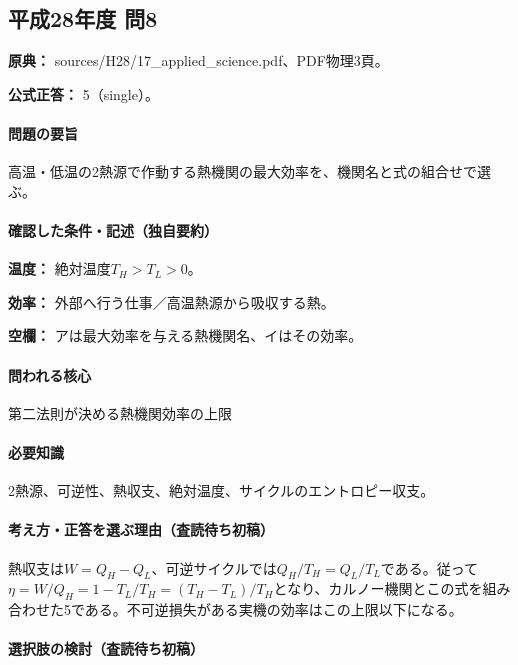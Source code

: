 \subsection{平成28年度 問8}
\label{q:h28-reg-applied-08}

\noindent\textbf{原典：} sources/H28/17\_applied\_science.pdf、PDF物理3頁。

\textbf{公式正答：} 5（single）。

\paragraph{問題の要旨} 高温・低温の2熱源で作動する熱機関の最大効率を、機関名と式の組合せで選ぶ。

\paragraph{確認した条件・記述（独自要約）}\mbox{}\par

\noindent\textbf{温度：} 絶対温度\(T_H>T_L>0\)。\par

\noindent\textbf{効率：} 外部へ行う仕事／高温熱源から吸収する熱。\par

\noindent\textbf{空欄：} アは最大効率を与える熱機関名、イはその効率。\par

\paragraph{問われる核心} 第二法則が決める熱機関効率の上限

\paragraph{必要知識} 2熱源、可逆性、熱収支、絶対温度、サイクルのエントロピー収支。

\paragraph{考え方・正答を選ぶ理由（査読待ち初稿）} 熱収支は\(W=Q_H-Q_L\)、可逆サイクルでは\(Q_H/T_H=Q_L/T_L\)である。従って\(\eta=W/Q_H=1-T_L/T_H=(T_H-T_L)/T_H\)となり、カルノー機関とこの式を組み合わせた5である。不可逆損失がある実機の効率はこの上限以下になる。

\paragraph{選択肢の検討（査読待ち初稿）}\mbox{}\par

